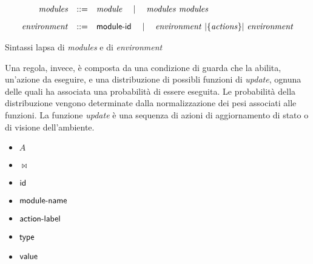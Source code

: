 \begin{table}[htbp!] %
$$
\begin{array}{rcl}
	\mathit{modules} &::=& \mathit{module} \quad\mid\quad \mathit{modules} \mbox{ } \mathit{modules}
		\\[.3cm]
	\mathit{environment} &::=& {\sf module}\textrm{-}{\sf id} \quad\mid\quad \mathit{environment} \mbox{ }|{\{\mathit{actions}\}}|\mbox{ } \mathit{environment}
		\\
\end{array}
$$
\caption{Sintassi \ac{lapsa} di \emph{modules} e di \emph{environment}}
\label{tab:lapsaModules}
\end{table}

Una regola, invece, è composta da una condizione di guarda che la abilita, un'azione da eseguire, e una distribuzione di possibli funzioni di \emph{update}, ognuna delle quali ha associata una probabilità di essere eseguita. Le probabilità della distribuzione vengono determinate dalla normalizzazione dei pesi associati alle funzioni. La funzione \emph{update} è una sequenza di azioni di aggiornamento di stato o di visione dell'ambiente.

\begin{itemize}
	\item $A$
	\item $\Join$
	\item ${\sf id}$
	\item ${\sf module}\textrm{-}{\sf name}$
	\item ${\sf action}\textrm{-}{\sf label}$
	\item ${\sf type}$
	\item ${\sf value}$
\end{itemize}

